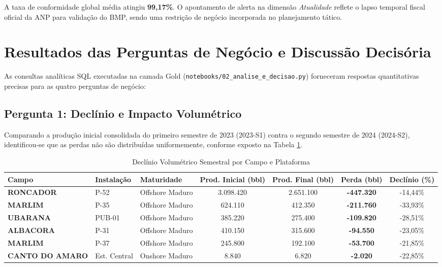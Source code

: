 \documentclass[12pt,a4paper]{article}
\begin{document}
\noindent A taxa de conformidade global média atingiu \textbf{99,17\%}. O apontamento de alerta na dimensão \textit{Atualidade} reflete o lapso temporal fiscal oficial da ANP para validação do BMP, sendo uma restrição de negócio incorporada no planejamento tático.

\section{Resultados das Perguntas de Negócio e Discussão Decisória}

As consultas analíticas SQL executadas na camada Gold (\texttt{notebooks/02\_analise\_e\_decisao.py}) forneceram respostas quantitativas precisas para as quatro perguntas de negócio:

\subsection{Pergunta 1: Declínio e Impacto Volumétrico}
Comparando a produção inicial consolidada do primeiro semestre de 2023 (2023-S1) contra o segundo semestre de 2024 (2024-S2), identificou-se que as perdas não são distribuídas uniformemente, conforme exposto na Tabela \ref{tab:p1}.

\begin{table}[htbp]
\centering
\small
\caption{Declínio Volumétrico Semestral por Campo e Plataforma}
\label{tab:p1}
\begin{tabular}{lllcccc}
\toprule
\textbf{Campo} & \textbf{Instalação} & \textbf{Maturidade} & \textbf{Prod. Inicial (bbl)} & \textbf{Prod. Final (bbl)} & \textbf{Perda (bbl)} & \textbf{Declínio (\%)} \\
\midrule
\textbf{RONCADOR} & P-52 & Offshore Maduro & 3.098.420 & 2.651.100 & \textbf{-447.320} & -14,44\% \\
\textbf{MARLIM} & P-35 & Offshore Maduro & 624.110 & 412.350 & \textbf{-211.760} & -33,93\% \\
\textbf{UBARANA} & PUB-01 & Offshore Maduro & 385.220 & 275.400 & \textbf{-109.820} & -28,51\% \\
\textbf{ALBACORA} & P-31 & Offshore Maduro & 410.150 & 315.600 & \textbf{-94.550} & -23,05\% \\
\textbf{MARLIM} & P-37 & Offshore Maduro & 245.800 & 192.100 & \textbf{-53.700} & -21,85\% \\
\textbf{CANTO DO AMARO} & Est. Central & Onshore Maduro & 8.840 & 6.820 & \textbf{-2.020} & -22,85\% \\
\bottomrule
\end{tabular}
\end{table}
\end{document}
